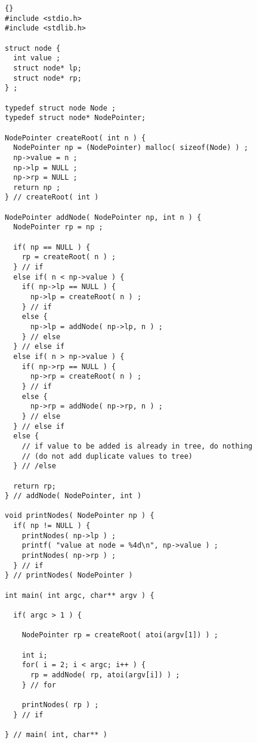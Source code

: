 \documentclass[twosides]{article}
\begin{document}
\begin{lstlisting}{}
#include <stdio.h>
#include <stdlib.h>

struct node {
  int value ;
  struct node* lp;
  struct node* rp;
} ;

typedef struct node Node ;
typedef struct node* NodePointer;

NodePointer createRoot( int n ) {
  NodePointer np = (NodePointer) malloc( sizeof(Node) ) ;
  np->value = n ;
  np->lp = NULL ;
  np->rp = NULL ;
  return np ;
} // createRoot( int )

NodePointer addNode( NodePointer np, int n ) {
  NodePointer rp = np ;

  if( np == NULL ) {
    rp = createRoot( n ) ;
  } // if
  else if( n < np->value ) {
    if( np->lp == NULL ) {
      np->lp = createRoot( n ) ;
    } // if
    else {
      np->lp = addNode( np->lp, n ) ;
    } // else
  } // else if
  else if( n > np->value ) {
    if( np->rp == NULL ) {
      np->rp = createRoot( n ) ;
    } // if
    else {
      np->rp = addNode( np->rp, n ) ;
    } // else
  } // else if
  else {
    // if value to be added is already in tree, do nothing
    // (do not add duplicate values to tree)
  } // /else

  return rp;
} // addNode( NodePointer, int )

void printNodes( NodePointer np ) {
  if( np != NULL ) {
    printNodes( np->lp ) ;
    printf( "value at node = %4d\n", np->value ) ;
    printNodes( np->rp ) ;
  } // if
} // printNodes( NodePointer )

int main( int argc, char** argv ) {

  if( argc > 1 ) {

    NodePointer rp = createRoot( atoi(argv[1]) ) ;

    int i;
    for( i = 2; i < argc; i++ ) {
      rp = addNode( rp, atoi(argv[i]) ) ;
    } // for

    printNodes( rp ) ;
  } // if

} // main( int, char** )
  \end{lstlisting}
\end{document}
